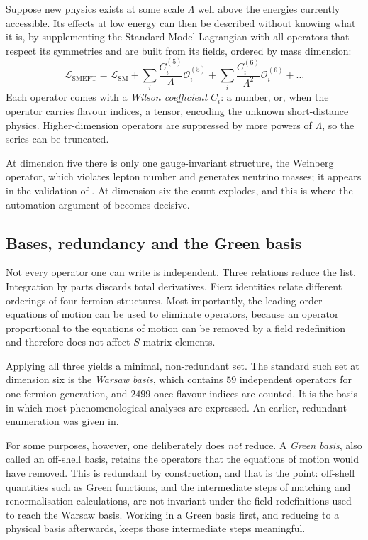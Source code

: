 Suppose new physics exists at some scale $\Lambda$ well above the energies
currently accessible. Its effects at low energy can then be described without
knowing what it is, by supplementing the Standard Model Lagrangian with all
operators that respect its symmetries and are built from its fields, ordered
by mass dimension:
\begin{equation}
    \mathcal{L}_{\mathrm{SMEFT}}
    = \mathcal{L}_{\mathrm{SM}}
    + \sum_i \frac{C^{(5)}_i}{\Lambda} \mathcal{O}^{(5)}_i
    + \sum_i \frac{C^{(6)}_i}{\Lambda^2} \mathcal{O}^{(6)}_i
    + \dots
    \label{eq:theory-smeft}
\end{equation}
Each operator comes with a \emph{Wilson coefficient} $C_i$: a number, or,
when the operator carries flavour indices, a tensor, encoding the unknown
short-distance physics. Higher-dimension operators are suppressed by more
powers of $\Lambda$, so the series can be truncated.

At dimension five there is only one gauge-invariant structure, the Weinberg
operator, which violates lepton number and generates
neutrino masses; it appears in the validation of
. At dimension six the count explodes, and
this is where the automation argument of  becomes
decisive.

\subsection{Bases, redundancy and the Green basis}
\label{sec:theory-green-basis}

Not every operator one can write is independent. Three relations reduce the
list. Integration by parts discards total derivatives. Fierz identities
relate different orderings of four-fermion structures. Most importantly, the
leading-order equations of motion can be used to eliminate operators, because
an operator proportional to the equations of motion can be removed by a field
redefinition and therefore does not affect $S$-matrix elements.

Applying all three yields a minimal, non-redundant set. The standard such set
at dimension six is the \emph{Warsaw basis}, which
contains $59$ independent operators for one fermion generation, and $2499$
once flavour indices are counted. It is the basis in which most
phenomenological analyses are expressed. An earlier, redundant enumeration
was given in.

For some purposes, however, one deliberately does \emph{not} reduce. A
\emph{Green basis}, also called an off-shell basis, retains the operators
that the equations of motion would have
removed. This is redundant by
construction, and that is the point: off-shell quantities such as Green
functions, and the intermediate steps of matching and renormalisation
calculations, are not invariant under the field
redefinitions used to reach the Warsaw basis. Working in a Green basis first,
and reducing to a physical basis afterwards, keeps those intermediate steps
meaningful.

